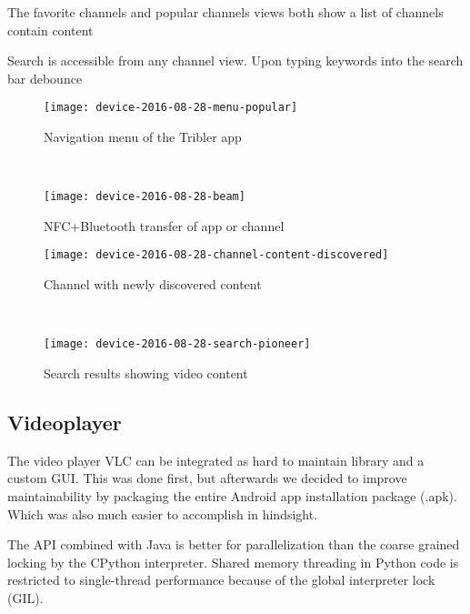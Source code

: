 
The favorite channels and popular channels views both show a list of channels  contain content

Search is accessible from any channel view.
Upon typing keywords into the search bar
debounce

\begin{figure}[p]
\centering
\begin{minipage}{.4\textwidth}
	\texttt{[image: device-2016-08-28-menu-popular]}
	\caption{Navigation menu of the Tribler app}
	\label{fig:menu-popular}
\end{minipage}
~
\begin{minipage}{.4\textwidth}
	\texttt{[image: device-2016-08-28-beam]}
	\caption{NFC+Bluetooth transfer of app or channel}
	\label{fig:beam}
\end{minipage}

\begin{minipage}{.4\textwidth}
	\texttt{[image: device-2016-08-28-channel-content-discovered]}
	\caption{Channel with newly discovered content}
	\label{fig:channel-content-discovered}
\end{minipage}
~
\begin{minipage}{.4\textwidth}
	\texttt{[image: device-2016-08-28-search-pioneer]}
	\caption{Search results showing video content}
	\label{fig:search-pioneer}
\end{minipage}
\end{figure}


\subsection{Videoplayer}
The video player VLC can be integrated as hard to maintain library and a custom GUI.
This was done first, but afterwards we decided to improve maintainability by packaging the entire Android app installation package (.apk).
Which was also much easier to accomplish in hindsight.

The API combined with Java is better for parallelization than the coarse grained locking by the CPython interpreter.
Shared memory threading in Python code is restricted to single-thread performance because of the global interpreter lock (GIL).



